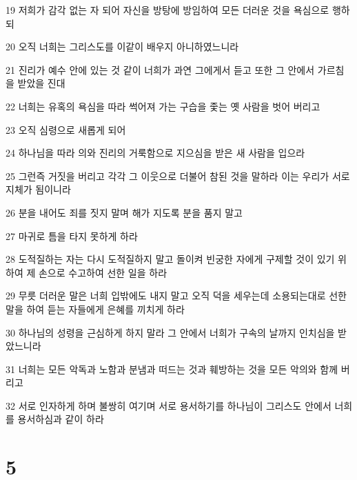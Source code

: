 \par 19 저희가 감각 없는 자 되어 자신을 방탕에 방임하여 모든 더러운 것을 욕심으로 행하되
\par 20 오직 너희는 그리스도를 이같이 배우지 아니하였느니라
\par 21 진리가 예수 안에 있는 것 같이 너희가 과연 그에게서 듣고 또한 그 안에서 가르침을 받았을 진대
\par 22 너희는 유혹의 욕심을 따라 썩어져 가는 구습을 좇는 옛 사람을 벗어 버리고
\par 23 오직 심령으로 새롭게 되어
\par 24 하나님을 따라 의와 진리의 거룩함으로 지으심을 받은 새 사람을 입으라
\par 25 그런즉 거짓을 버리고 각각 그 이웃으로 더불어 참된 것을 말하라 이는 우리가 서로 지체가 됨이니라
\par 26 분을 내어도 죄를 짓지 말며 해가 지도록 분을 품지 말고
\par 27 마귀로 틈을 타지 못하게 하라
\par 28 도적질하는 자는 다시 도적질하지 말고 돌이켜 빈궁한 자에게 구제할 것이 있기 위하여 제 손으로 수고하여 선한 일을 하라
\par 29 무릇 더러운 말은 너희 입밖에도 내지 말고 오직 덕을 세우는데 소용되는대로 선한 말을 하여 듣는 자들에게 은혜를 끼치게 하라
\par 30 하나님의 성령을 근심하게 하지 말라 그 안에서 너희가 구속의 날까지 인치심을 받았느니라
\par 31 너희는 모든 악독과 노함과 분냄과 떠드는 것과 훼방하는 것을 모든 악의와 함께 버리고
\par 32 서로 인자하게 하며 불쌍히 여기며 서로 용서하기를 하나님이 그리스도 안에서 너희를 용서하심과 같이 하라

\chapter{5}

